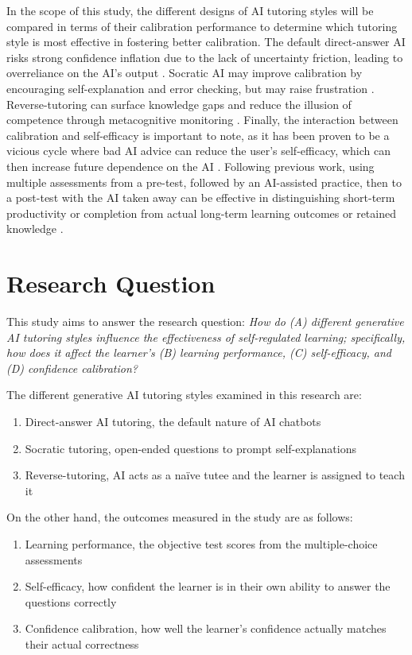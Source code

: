 \documentclass{article}
\begin{document}
In the scope of this study, the different designs of AI tutoring styles 
will be compared in terms of their calibration performance 
to determine which tutoring style is most effective in fostering 
better calibration. The default direct-answer AI risks strong confidence inflation 
due to the lack of uncertainty friction, leading to overreliance on the AI's output \cite{Bastani2025}. 
Socratic AI may improve calibration by encouraging self-explanation and error checking, 
but may raise frustration \cite{Jin2025,Bastani2025}. Reverse-tutoring 
can surface knowledge gaps and reduce the illusion of competence through 
metacognitive monitoring \cite{Fiorella2023}. Finally, the interaction between 
calibration and self-efficacy is important to note, as it has been proven to be a 
vicious cycle where bad AI advice can reduce the user's self-efficacy, 
which can then increase future dependence on the AI \cite{Chong2022}. 
Following previous work, using multiple assessments from a pre-test, 
followed by an AI-assisted practice, then to a post-test with the 
AI taken away can be effective in distinguishing short-term productivity 
or completion from actual long-term learning outcomes or retained knowledge \cite{Bastani2025}.


\section{Research Question}
\label{sec:research-question}

This study aims to answer the research question:
\textit{How do (A) different generative AI tutoring styles influence the effectiveness of self-regulated learning;
specifically, how does it affect the learner's (B) learning performance, (C) self-efficacy, and 
(D) confidence calibration?}

The different generative AI tutoring styles examined in this research are:
\begin{enumerate}
    \item Direct-answer AI tutoring, the default nature of AI chatbots
    \item Socratic tutoring, open-ended questions to prompt self-explanations
    \item Reverse-tutoring, AI acts as a naïve tutee and the learner is assigned to teach it
\end{enumerate}

On the other hand, the outcomes measured in the study are as follows:
\begin{enumerate}
    \item Learning performance, the objective test scores from the multiple-choice assessments
    \item Self-efficacy, how confident the learner is in their own ability to answer the questions correctly
    \item Confidence calibration, how well the learner's confidence actually matches their actual correctness
\end{enumerate}
\end{document}
